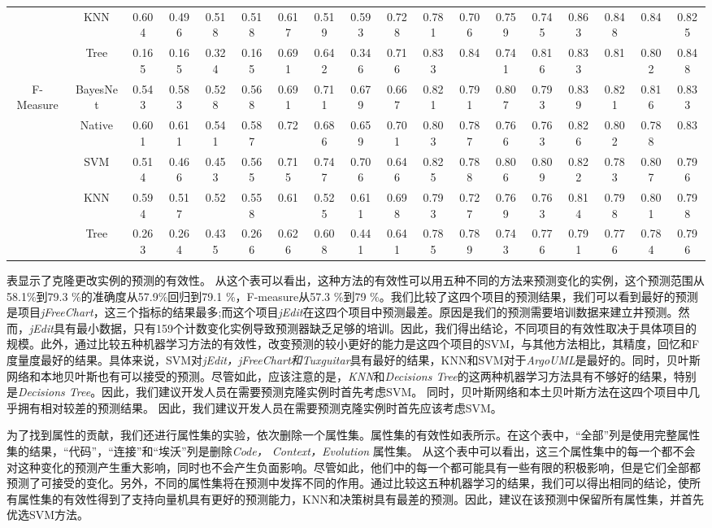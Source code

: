 {\begin{table*}[htbp]
\begin{tabular}{cccccccccccccccccc}
&KNN&	0.604	&0.496	&0.518	&0.518		&0.617	&0.519	&0.593	&0.728		&0.781	&0.706	&0.759	&0.745		&0.863	&0.848	&0.84	&0.825\\
&Tree&	0.165	&0.165	&0.324	&0.165		&0.691	&0.642	&0.346	&0.716		&0.833	&0.84	&0.741	&0.816		&0.833	&0.81	&0.802	&0.848\\
\hline
\multirow{5}{*}{F-Measure}
&BayesNet&0.543	&0.583	&0.528	&0.568		&0.691	&0.711	&0.679	&0.667		&0.821	&0.791	&0.807	&0.793		&0.839	&0.821	&0.816	&0.833\\
&Native&0.601	&0.611	&0.541	&0.587		&0.72	&0.686	&0.659	&0.701		&0.803	&0.787	&0.766	&0.763		&0.826	&0.802	&0.788	&0.83\\
&SVM&	0.514	&0.466	&0.453	&0.565		&0.715	&0.747	&0.706	&0.646		&0.825	&0.788	&0.806	&0.809		&0.822	&0.783	&0.807	&0.796\\
&KNN&	0.594	&0.517	&0.52	&0.558		&0.61	&0.525	&0.611	&0.698		&0.793	&0.727	&0.769	&0.763		&0.814	&0.798	&0.801	&0.798\\
&Tree&	0.263	&0.264	&0.435	&0.266		&0.626	&0.608	&0.441	&0.641		&0.785	&0.789	&0.743	&0.776		&0.791	&0.776	&0.784	&0.796\\
\bottomrule[1.5pt]
\end{tabular}
\end{table*}


表显示了克隆更改实例的预测的有效性。
从这个表可以看出，这种方法的有效性可以用五种不同的方法来预测变化的实例，这个预测范围从58.1\%到79.3 \%的准确度从57.9\%回归到79.1 \%，F-measure从57.3 \%到79 \%。我们比较了这四个项目的预测结果，我们可以看到最好的预测是项目{\em  jFreeChart}，这三个指标的结果最多;而这个项目{\em jEdit}在这四个项目中预测最差。原因是我们的预测需要培训数据来建立井预测。然而，{\em jEdit}具有最小数据，只有159个计数变化实例导致预测器缺乏足够的培训。因此，我们得出结论，不同项目的有效性取决于具体项目的规模。此外，通过比较五种机器学习方法的有效性，改变预测的较小更好的能力是这四个项目的SVM，与其他方法相比，其精度，回忆和F度量度最好的结果。具体来说，SVM对{\em jEdit，jFreeChart和Tuxguitar}具有最好的结果，KNN和SVM对于{\em ArgoUML}是最好的。同时，贝叶斯网络和本地贝叶斯也有可以接受的预测。尽管如此，应该注意的是，{\em KNN}和{\em Decisions Tree}的这两种机器学习方法具有不够好的结果，特别是{\em Decisions Tree}。因此，我们建议开发人员在需要预测克隆实例时首先考虑SVM。
同时，贝叶斯网络和本土贝叶斯方法在这四个项目中几乎拥有相对较差的预测结果。
因此，我们建议开发人员在需要预测克隆实例时首先应该考虑SVM。

为了找到属性的贡献，我们还进行属性集的实验，依次删除一个属性集。属性集的有效性如表所示。在这个表中，“全部”列是使用完整属性集的结果，“代码”，“连接”和“埃沃”列是删除{\em Code， Context，Evolution }属性集。
从这个表中可以看出，这三个属性集中的每一个都不会对这种变化的预测产生重大影响，同时也不会产生负面影响。尽管如此，他们中的每一个都可能具有一些有限的积极影响，但是它们全部都预测了可接受的变化。另外，不同的属性集将在预测中发挥不同的作用。通过比较这五种机器学习的结果，我们可以得出相同的结论，使所有属性集的有效性得到了支持向量机具有更好的预测能力，KNN和决策树具有最差的预测。因此，建议在该预测中保留所有属性集，并首先优选SVM方法。


}
